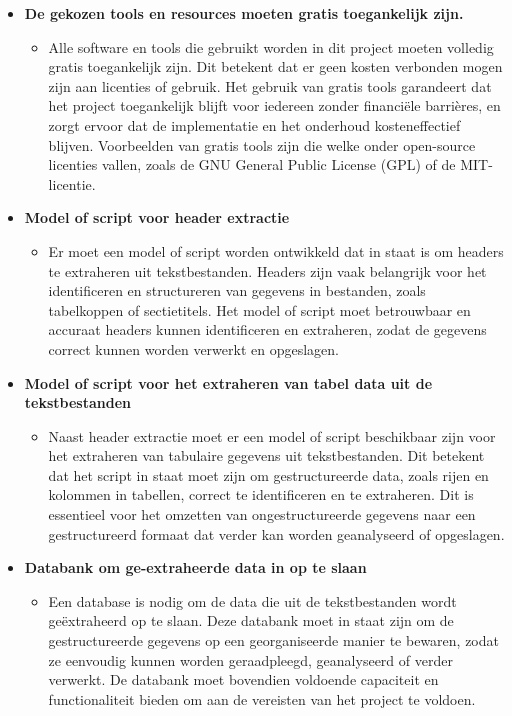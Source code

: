 \begin{itemize}
    \item \textbf{De gekozen tools en resources moeten gratis toegankelijk zijn.}
    \begin{itemize}
        \item Alle software en tools die gebruikt worden in dit project moeten volledig gratis toegankelijk zijn. Dit betekent dat er geen kosten verbonden mogen zijn aan licenties of gebruik. Het gebruik van gratis tools garandeert dat het project toegankelijk blijft voor iedereen zonder financiële barrières, en zorgt ervoor dat de implementatie en het onderhoud kosteneffectief blijven. Voorbeelden van gratis tools zijn die welke onder open-source licenties vallen, zoals de GNU General Public License (GPL) of de MIT-licentie.
    \end{itemize}
    
    \item \textbf{Model of script voor header extractie}
    \begin{itemize}
        \item Er moet een model of script worden ontwikkeld dat in staat is om headers te extraheren uit tekstbestanden. Headers zijn vaak belangrijk voor het identificeren en structureren van gegevens in bestanden, zoals tabelkoppen of sectietitels. Het model of script moet betrouwbaar en accuraat headers kunnen identificeren en extraheren, zodat de gegevens correct kunnen worden verwerkt en opgeslagen.
    \end{itemize}
    
    \item \textbf{Model of script voor het extraheren van tabel data uit de tekstbestanden}
    \begin{itemize}
        \item Naast header extractie moet er een model of script beschikbaar zijn voor het extraheren van tabulaire gegevens uit tekstbestanden. Dit betekent dat het script in staat moet zijn om gestructureerde data, zoals rijen en kolommen in tabellen, correct te identificeren en te extraheren. Dit is essentieel voor het omzetten van ongestructureerde gegevens naar een gestructureerd formaat dat verder kan worden geanalyseerd of opgeslagen.
    \end{itemize}
    
    \item \textbf{Databank om ge-extraheerde data in op te slaan}
    \begin{itemize}
        \item Een database is nodig om de data die uit de tekstbestanden wordt geëxtraheerd op te slaan. Deze databank moet in staat zijn om de gestructureerde gegevens op een georganiseerde manier te bewaren, zodat ze eenvoudig kunnen worden geraadpleegd, geanalyseerd of verder verwerkt. De databank moet bovendien voldoende capaciteit en functionaliteit bieden om aan de vereisten van het project te voldoen.
    \end{itemize}
\end{itemize}

